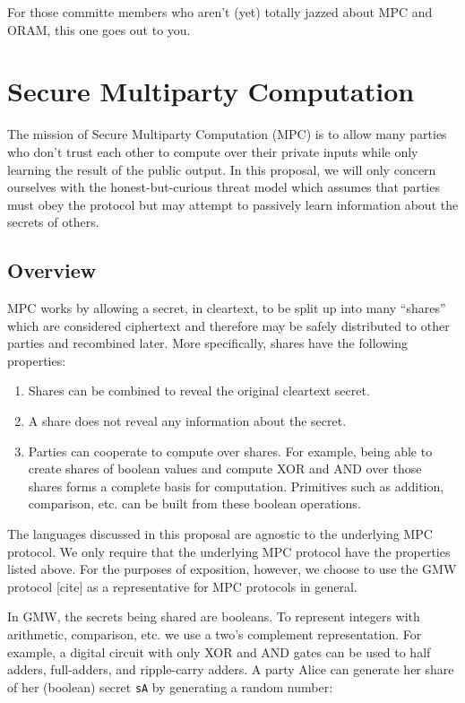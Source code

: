 \documentclass{report}
\newcommand{\alice}{Alice\xspace}
\begin{document}
For those committe members who aren't (yet) totally jazzed about MPC and ORAM, this one goes out to you.

\section{Secure Multiparty Computation}

The mission of Secure Multiparty Computation (MPC) is to allow many parties who don’t trust each
other to compute over their private inputs while only learning the result of the public output.
In this proposal, we will only concern ourselves with the honest-but-curious threat model which
assumes that parties must obey the protocol but may attempt to passively learn information about the secrets of others.

\subsection{Overview}

MPC works by allowing a secret, in cleartext, to be split up into many ``shares'' which are considered ciphertext
and therefore may be safely distributed to other parties and recombined later. More specifically, shares have the following properties:
\begin{enumerate}
\item Shares can be combined to reveal the original cleartext secret.
\item A share does not reveal any information about the secret.
\item Parties can cooperate to compute over shares. For example, being able to create shares of boolean values
  and compute XOR and AND over those shares forms a complete basis for computation. Primitives such as addition,
  comparison, etc. can be built from these boolean operations.
\end{enumerate}

The languages discussed in this proposal are agnostic to the underlying MPC protocol. We only require that the underlying MPC protocol
have the properties listed above. For the purposes of exposition, however, we choose to use the GMW protocol [cite] as a
representative for MPC protocols in general.

In GMW, the secrets being shared are booleans. To represent integers with arithmetic, comparison, etc. we use a two's
complement representation. For example, a digital circuit with only XOR and AND gates can be used to half adders,
full-adders, and ripple-carry adders. A party \alice can generate her share of her (boolean) secret \lstinline{sA} by
generating a random number:
\end{document}
